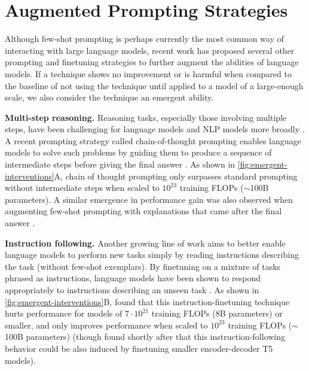 \documentclass[10pt]{article} %
\begin{document}
\section{Augmented Prompting Strategies}\label{sec:interventions}

Although few-shot prompting is perhaps currently the most common way of interacting with large language models, recent work has proposed several other prompting and finetuning strategies to further augment the abilities of language models.
If a technique shows no improvement or is harmful when compared to the baseline of not using the technique until applied to a model of a large-enough scale, we also consider the technique an emergent ability.



\vspace{3mm}
\noindent
\textbf{Multi-step reasoning.}
Reasoning tasks, especially those involving multiple steps, have been challenging for language models and NLP models more broadly \citep{rae2021scaling,bommasani2021opportunities,nye2021show}.
A recent prompting strategy called chain-of-thought prompting enables language models to solve such problems by guiding them to produce a sequence of intermediate steps before giving the final answer \citep{cobbe2021training,wei2022chain,suzgun2022challenging}.
As shown in \cref{fig:emergent-interventions}A, chain of thought prompting only surpasses standard prompting without intermediate steps when scaled to $10^{23}$ training FLOPs ($\sim$100B parameters).
A similar emergence in performance gain was also observed when augmenting few-shot prompting with explanations that came after the final answer \citep{lampinen2022can}.

\vspace{3mm}
\noindent
\textbf{Instruction following.}
Another growing line of work aims to better enable language models to perform new tasks simply by reading instructions describing the task (without few-shot exemplars). %
By finetuning on a mixture of tasks phrased as instructions, language models have been shown to respond appropriately to instructions describing an unseen task \citep{ouyang2022training,wei2021finetuned,sanh2022multitask,chung2022scaling}.
As shown in \cref{fig:emergent-interventions}B, \citet{wei2021finetuned} found that this instruction-finetuning technique hurts performance for models of $7 \cdot 10^{21}$ training FLOPs (8B parameters) or smaller, and only improves performance when scaled to $10^{23}$ training FLOPs ($\sim$100B parameters) (though \citet{sanh2022multitask} found shortly after that this instruction-following behavior could be also induced by finetuning smaller encoder-decoder T5 models).
\end{document}
